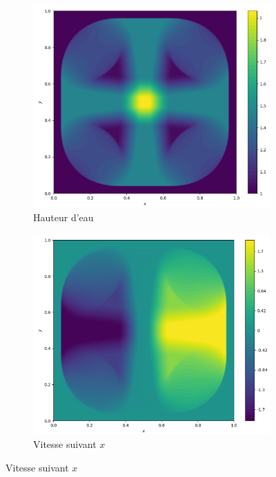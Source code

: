 \documentclass[
	french,
	11pt, %
]{fphw}
\begin{document}
\begin{figure}[H]
	\centering
	\begin{subfigure}{0.32\textwidth}
		\centering
		\includegraphics[width=\textwidth,height=0.85\textwidth]{Muscl1h.png}
		\caption{Hauteur d'eau}
		\label{fig:Muscl1h}
	\end{subfigure}
	\begin{subfigure}{0.32\textwidth}
		\centering
		\includegraphics[width=\textwidth,height=0.85\textwidth]{Muscl1u.png}
		\caption{Vitesse suivant $x$}

\end{subfigure}
\end{figure}
\end{document}
